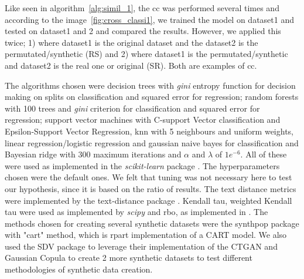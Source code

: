 Like seen in algorithm~\ref{alg:simil_1}, the \ac{cc} was performed several times and according to the image~\ref{fig:cross_classi1}, we trained the model on dataset1 and tested on dataset1 and 2 and compared the results. However, we applied this twice; 1) where dataset1 is the original dataset and the dataset2 is the permutated/synthetic (RS) and 2) where dataset1 is the permutated/synthetic and dataset2 is the real one or original (SR). Both are examples of \acl{cc}.

The algorithms chosen were decision trees with \textit{gini} entropy function for decision making on splits on classification and squared error for regression; random forests with 100 trees and \textit{gini} criterion for classification and squared error for regression; support vector machines with C-support Vector classification and Epsilon-Support Vector Regression, \ac{knn} with 5 neighbours and uniform weights, linear regression/logistic regression and gaussian naive bayes for classification and Bayesian ridge with 300 maximum iterations and $\alpha$ and $\lambda$ of $1e^{-6}$. All of these were used as implemented in the \textit{scikit-learn} package \cite{scikit-learn}. The hyperparameters chosen were the default ones. We felt that tuning was not necessary here to test our hypothesis, since it is based on the ratio of results.
The text distance metrics were implemented by the text-distance package \cite{orsiniumTextdistanceComputeDistance}. Kendall tau, weighted Kendall tau were used as implemented by \textit{scipy} \cite{virtanenSciPyFundamentalAlgorithms2020a} and \ac{rbo}, as implemented in \cite{chenRankbiasedOverlapRBO2023}.
The methods chosen for creating several synthetic datasets were the synthpop package \cite{synthpop} with "cart" method, which is rpart implementation of a CART model. We also used  the SDV package \cite{SDV} to leverage their implementation of the CTGAN and Gaussian Copula to create 2 more synthetic datasets to test different methodologies of synthetic data creation.






